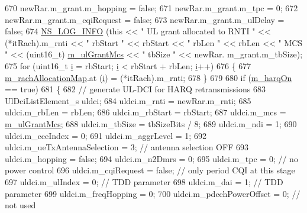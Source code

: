 \begin{DoxyCode}
670       newRar.m\_grant.m\_hopping = \textcolor{keyword}{false};
671       newRar.m\_grant.m\_tpc = 0;
672       newRar.m\_grant.m\_cqiRequest = \textcolor{keyword}{false};
673       newRar.m\_grant.m\_ulDelay = \textcolor{keyword}{false};
674       \hyperlink{group__logging_gafbd73ee2cf9f26b319f49086d8e860fb}{NS\_LOG\_INFO} (\textcolor{keyword}{this} << \textcolor{stringliteral}{" UL grant allocated to RNTI "} << (*itRach).m\_rnti << \textcolor{stringliteral}{" rbStart "} << 
      rbStart << \textcolor{stringliteral}{" rbLen "} << rbLen << \textcolor{stringliteral}{" MCS "} << (uint16\_t) \hyperlink{classns3_1_1RrFfMacScheduler_ac03ec32deb759ca862b6ab9475929798}{m\_ulGrantMcs} << \textcolor{stringliteral}{" tbSize "} << newRar.
      m\_grant.m\_tbSize);
675       \textcolor{keywordflow}{for} (uint16\_t \hyperlink{bernuolliDistribution_8m_a6f6ccfcf58b31cb6412107d9d5281426}{i} = rbStart; \hyperlink{bernuolliDistribution_8m_a6f6ccfcf58b31cb6412107d9d5281426}{i} < rbStart + rbLen; \hyperlink{bernuolliDistribution_8m_a6f6ccfcf58b31cb6412107d9d5281426}{i}++)
676         \{
677           \hyperlink{classns3_1_1RrFfMacScheduler_ac3a35483a21997065f49ff72707a90aa}{m\_rachAllocationMap}.at (\hyperlink{bernuolliDistribution_8m_a6f6ccfcf58b31cb6412107d9d5281426}{i}) = (*itRach).m\_rnti;
678         \}
679 
680       \textcolor{keywordflow}{if} (\hyperlink{classns3_1_1RrFfMacScheduler_aa57694b4b80d2dc907f1e5281d3defab}{m\_harqOn} == \textcolor{keyword}{true})
681         \{
682           \textcolor{comment}{// generate UL-DCI for HARQ retransmissions}
683           UlDciListElement\_s uldci;
684           uldci.m\_rnti = newRar.m\_rnti;
685           uldci.m\_rbLen = rbLen;
686           uldci.m\_rbStart = rbStart;
687           uldci.m\_mcs = \hyperlink{classns3_1_1RrFfMacScheduler_ac03ec32deb759ca862b6ab9475929798}{m\_ulGrantMcs};
688           uldci.m\_tbSize = tbSizeBits / 8;
689           uldci.m\_ndi = 1;
690           uldci.m\_cceIndex = 0;
691           uldci.m\_aggrLevel = 1;
692           uldci.m\_ueTxAntennaSelection = 3; \textcolor{comment}{// antenna selection OFF}
693           uldci.m\_hopping = \textcolor{keyword}{false};
694           uldci.m\_n2Dmrs = 0;
695           uldci.m\_tpc = 0; \textcolor{comment}{// no power control}
696           uldci.m\_cqiRequest = \textcolor{keyword}{false}; \textcolor{comment}{// only period CQI at this stage}
697           uldci.m\_ulIndex = 0; \textcolor{comment}{// TDD parameter}
698           uldci.m\_dai = 1; \textcolor{comment}{// TDD parameter}
699           uldci.m\_freqHopping = 0;
700           uldci.m\_pdcchPowerOffset = 0; \textcolor{comment}{// not used}

\end{DoxyCode}
